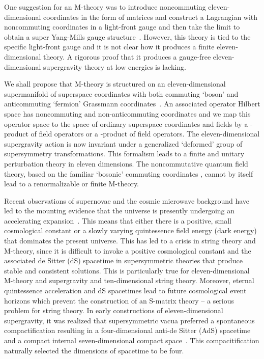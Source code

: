 \documentclass[a4paper,12pt]{article}
\begin{document}
One suggestion for an
M-theory was to introduce noncommuting eleven-dimensional
coordinates in the form of \coordHE{} matrices and construct a
Lagrangian with noncommuting coordinates in a light-front gauge
and then take the \coordHE{} limit to obtain a super
Yang-Mills gauge structure~\cite{Susskind}. However, this theory is tied to the
specific light-front gauge and it is not clear how it produces a
finite eleven-dimensional theory. A rigorous proof that it
produces a gauge-free eleven-dimensional supergravity theory at
low energies is lacking.

We shall propose that M-theory is structured on an
eleven-dimensional supermanifold of superspace coordinates with
both commuting `boson' and anticommuting `fermion'
Grassmann
coordinates~\cite{Moffat2,Moffat3,Moffat4,Moffat5}.
An associated operator Hilbert space has noncommuting and
non-anticommuting coordinates and we map this operator space to
the space of ordinary superspace coordinates and fields by a
\myHighlight{$\circ$}\coordHE{}-product of field operators or a \myHighlight{$\diamondsuit$}\coordHE{}-product
of field operators. The eleven-dimensional supergravity action
is now invariant under a generalized `deformed' group of
supersymmetry transformations. This formalism leads to a finite
and unitary perturbation theory in eleven dimensions. The
noncommutative quantum field theory, based on the familiar
`bosonic' commuting coordinates \coordHE{}, cannot by itself lead to
a renormalizable or finite M-theory.

Recent observations of supernovae and the cosmic microwave background have led to the
mounting evidence that the universe is presently undergoing an accelerating
expansion~\cite{Perlmutter,Netterfield}. This means that either there is a positive,
small cosmological constant or a slowly varying quintessence field energy (dark
energy)~\cite{Caldwell} that dominates the present universe. This has led to a
crisis in string theory and M-theory, since it is difficult to invoke a positive
cosmological constant and the associated de Sitter (dS) spacetime in supersymmetric
theories that produce stable and consistent solutions. This is particularly true for
eleven-dimensional M-theory and supergravity and ten-dimensional string theory.
Moreover, eternal quintessence acceleration and dS spacetimes lead to future
cosmological event horizons which prevent the construction of an S-matrix theory --
a serious problem for string theory. In early constructions of eleven-dimensional
supergravity, it was realized that supersymmetric vacua preferred a spontaneous
compactification resulting in a four-dimensional anti-de Sitter (AdS) spacetime and
a compact internal seven-dimensional compact
space~\cite{Freund,Freund2,Englert,Duff2}. This compacitification naturally selected
the dimensions of spacetime to be four.
\end{document}
